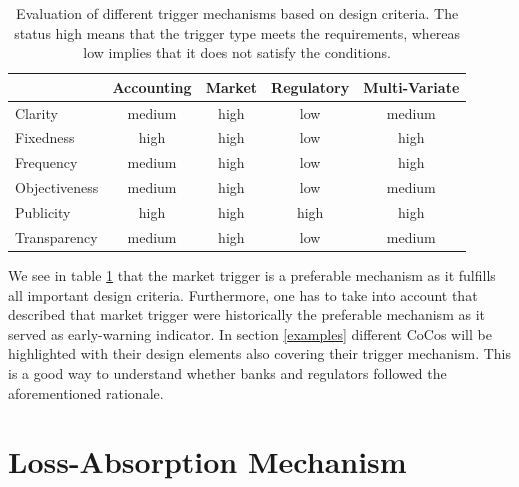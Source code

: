 \begin{table}[H]
	\setlength{\extrarowheight}{2.5pt}
	\centering
	\begin{tabular}{lcccc}
		\toprule
			 & Accounting & Market & Regulatory & Multi-Variate \\
		\midrule
			Clarity & \cellcolor{yellow!20} medium & \cellcolor{green!20} high & \cellcolor{red!20} low & \cellcolor{yellow!20} medium\\
			Fixedness & \cellcolor{green!20} high & \cellcolor{green!20} high & \cellcolor{red!20} low & \cellcolor{green!20} high \\
			Frequency & \cellcolor{yellow!20} medium & \cellcolor{green!20} high & \cellcolor{red!20} low & \cellcolor{green!20} high\\
			Objectiveness & \cellcolor{yellow!20} medium & \cellcolor{green!20} high & \cellcolor{red!20} low & \cellcolor{yellow!20} medium \\
			Publicity & \cellcolor{green!20} high & \cellcolor{green!20} high & \cellcolor{green!20} high & \cellcolor{green!20} high \\
			Transparency & \cellcolor{yellow!20} medium & \cellcolor{green!20} high & \cellcolor{red!20} low & \cellcolor{yellow!20} medium \\
		\bottomrule
	\end{tabular}
	\caption[Evaluation of different trigger mechanisms]{Evaluation of different trigger mechanisms based on design criteria. The status high means that the trigger type meets the requirements, whereas low implies that it does not satisfy the conditions. \citep{erismann2015pricing}}
	\label{table:evaluationtrigger}
\end{table}

We see in table \ref{table:evaluationtrigger} that the market trigger is a preferable mechanism as it fulfills all important design criteria. Furthermore, one has to take into account that \citet{haldane2011capital} described that market trigger were historically the preferable mechanism as it served as early-warning indicator. In section \ref{examples} different CoCos will be highlighted with their design elements also covering their trigger mechanism. This is a good way to understand whether banks and regulators followed the aforementioned rationale.

\section{Loss-Absorption Mechanism} \label{lossabsorption}

